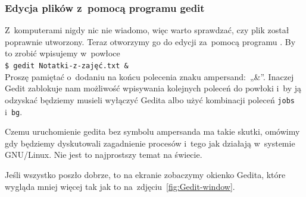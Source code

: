 \documentclass[10pt,t]{beamer}
\begin{document}
\begin{frame}
  \frametitle{Edycja plików z~pomocą programu gedit}


  Z~komputerami nigdy nic nie wiadomo, więc warto sprawdzać, czy plik
  został poprawnie utworzony. Teraz otworzymy go do edycji za~pomocą
  programu . By to zrobić
  wpisujemy w~powłoce \\
  \texttt{\$ gedit Notatki-z-zajęć.txt \&} \\
  Proszę pamiętać o~dodaniu na końcu polecenia znaku
  \alert{ampersand}:~„\&”. Inaczej Gedit zablokuje nam możliwość wpisywania
  kolejnych poleceń do powłoki i~by ją odzyskać będziemy musieli
  wyłączyć Gedita albo użyć kombinacji poleceń \texttt{jobs} i~\texttt{bg}.

  Czemu uruchomienie gedita bez symbolu ampersanda ma takie skutki, omówimy
  gdy będziemy dyskutowali zagadnienie procesów i~tego jak działają
  w~systemie GNU/Linux. Nie jest to najprostszy temat na świecie.

  Jeśli wszystko poszło dobrze, to na ekranie zobaczymy okienko Gedita,
  które wygląda mniej więcej tak jak to
  na~zdjęciu~\eqref{fig:Gedit-window}.

\end{frame}
\end{document}
